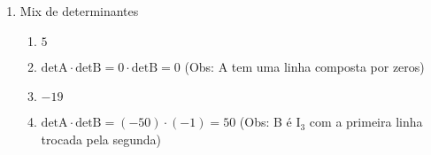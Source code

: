 \documentclass[a4paper]{article}
\begin{document}
\begin{multicols}{2}
\begin{enumerate}
\begin{enumerate}
    \end{enumerate}

  \item Mix de determinantes

    \begin{enumerate}
    \item $ 5 $

    \item $ \mathrm{detA} \cdot \mathrm{detB} = 0 \cdot \mathrm{detB}
      = 0 $ (Obs: A tem uma linha composta por zeros)

    \item $ -19 $

    \item $ \mathrm{detA} \cdot \mathrm{detB} = (-50) \cdot (-1) = 50
      $ (Obs: B é $\mathrm{I}_3$ com a primeira linha trocada pela
      segunda)

    \end{enumerate}

  \end{enumerate}
  
\end{multicols}
\end{document}
